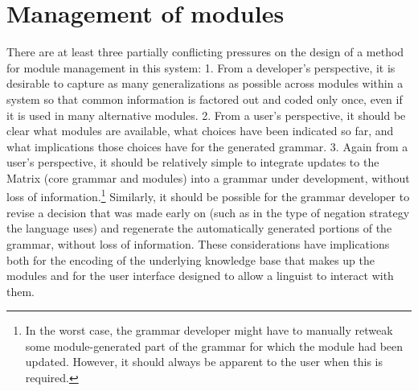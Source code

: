 \documentclass[11pt]{article}
\begin{document}
\section{Management of modules}
\label{management}

There are at least three partially conflicting pressures on the design
of a method for module management in this system: 1. From a developer's
perspective, it is desirable to capture as many generalizations as
possible across modules within a system so that common information is
factored out and coded only once, even if it is used in many
alternative modules. 2. From a user's perspective, it should be clear
what modules are available, what choices have been indicated so far,
and what implications those choices have for the generated grammar.
3. Again from a user's perspective, it should be relatively simple to
integrate updates to the Matrix (core grammar and modules) into a
grammar under development, without loss of information.\footnote{In
the worst case, the grammar developer might have to manually retweak
some module-generated part of the grammar for which the module had
been updated.  However, it should always be apparent to the user when
this is required.}  Similarly, it should be possible for the grammar
developer to revise a decision that was made early on (such as in the
type of negation strategy the language uses) and regenerate the
automatically generated portions of the grammar, without loss of
information.  These considerations have implications both for the
encoding of the underlying knowledge base that makes up the modules
and for the user interface designed to allow a linguist to interact
with them.
\end{document}
